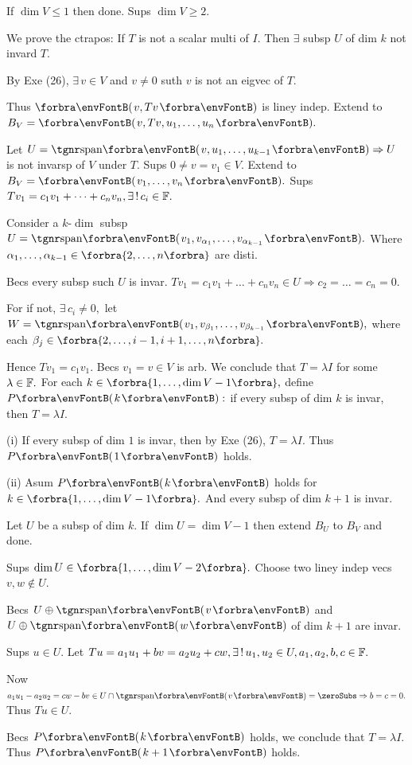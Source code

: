 If $\dim V\leqslant 1$ then done. Sups $\dim V\geqslant 2.$\par\quad
We prove the ctrapos: {\tgsl If $T$ is not a scalar multi of $I$. Then $\exists$ subsp $U$ of dim $k$ not invard $T.$}\par\quad
By Exe (26), $\exists\,v\in V$ and $v\neq 0$ suth $v$ is not an eigvec of $T.$\par\quad
Thus $\Par{v,Tv}$ is liney indep. Extend to $B_V=\Par{v,Tv,u_1,\dots,u_n}.$\par\quad
Let $U=\Span{v,u_1,\dots,u_{k-1}}\Rightarrow U$ is not invarsp of $V$ under $T.$\PfEnd\vspace{6pt}\quad
\Or Sups $0\neq v=v_1\in V.$ Extend to $B_V=\Par{v_1,\dots,v_n}.$ Sups $Tv_1=c_1 v_1+\dots+c_n v_n,\exists\,!\,c_i\in{\mathbb{F}}.$\par\quad
Consider a $k$\hspace{1pt}-\hspace{1pt}$\dim$ subsp $U=\Span{v_1,v_{\alpha_1},\dots,v_{\alpha_{k-1}}}.$ Where $\alpha_1,\dots,\alpha_{k-1}\in\Bra{2,\dots,n}$ are disti.\par\quad
Becs every subsp such $U$ is invar. $Tv_1=c_1 v_1+\dots+c_n v_n\in U\Longrightarrow c_2=\dots=c_n=0.$\vspace{0pt}\par\quad
For if not, $\exists\,c_i\neq 0,$ let $W=\Span{v_1,v_{\beta_1},\dots,v_{\beta_{k-1}}},$ where each $\beta_j\in\Bra{{2,\dots,i-1,i+1,\dots,n}}.$\par\quad
Hence $Tv_1=c_1 v_1.$ Becs $v_1=v\in V$ is arb. We conclude that $T=\lambda I$ for some $\lambda\in{\mathbb{F}}.$\PfEnd\vspace{6pt}\quad
\Or For each $k\in\Bra{1,\dots,\dim V-1},$ define $P\Par{k}:$ if every subsp of dim $k$ is invar, then $T=\lambda I.$\par\quad
(i) If every subsp of dim $1$ is invar, then by Exe (26), $T=\lambda I.$ Thus $P\Par{1}$ holds.\par\quad\Endi
(ii) Asum $P\Par{k}$ holds for $k\in\Bra{1,\dots,\dim V-1}.$ And every subsp of dim $k+1$ is invar.\par\quad\Hii
Let $U$ be a subsp of dim $k.$ If $\dim U=\dim V-1$ then extend $B_U$ to $B_V$ and done.\par\quad\Hii
Sups $\dim U\in\Bra{1,\dots,\dim V-2}.$ Choose two liney indep vecs $v,w\not\in U.$\par\quad\Hii
Becs $U\oplus\Span{v}$ and $U\oplus\Span{w}$ of dim $k+1$ are invar.\par\quad\Hii
Sups $u\in U.$ Let $Tu=a_1u_1+bv=a_2u_2+cw,\exists\,!\,u_1,u_2\in U,a_1,a_2,b,c\in{\mathbb{F}}.$\par\quad\Hii
Now $a_1u_1-a_2u_2=cw-bv\in U\cap\Span{v}=\zeroSubs\Rightarrow b=c=0.$ Thus $Tu\in U.$\par\quad\Hii
Becs $P\Par{k}$ holds, we conclude that $T=\lambda I.$ Thus $P\Par{k+1}$ holds.\PfEnd
\SepLine

